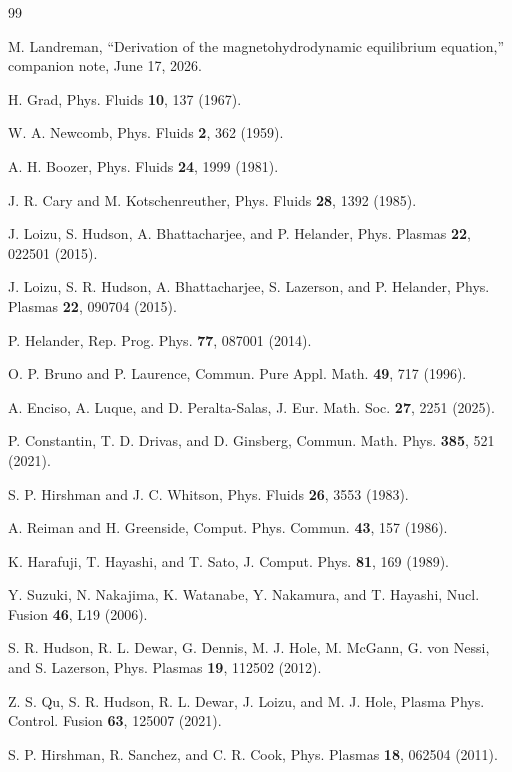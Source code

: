 \documentclass[english]{article}
\begin{document}
\begin{thebibliography}{99}

 M. Landreman, ``Derivation of the magnetohydrodynamic equilibrium
equation,'' companion note, June 17, 2026.

 H. Grad, Phys. Fluids {\bf 10}, 137 (1967).

 W. A. Newcomb, Phys. Fluids {\bf 2}, 362 (1959).

 A. H. Boozer, Phys. Fluids {\bf 24}, 1999 (1981).

 J. R. Cary and M. Kotschenreuther, Phys. Fluids {\bf 28}, 1392 (1985).

 J. Loizu, S. Hudson, A. Bhattacharjee, and P. Helander,
Phys. Plasmas {\bf 22}, 022501 (2015).

 J. Loizu, S. R. Hudson, A. Bhattacharjee, S. Lazerson, and P. Helander,
Phys. Plasmas {\bf 22}, 090704 (2015).

 P. Helander, Rep. Prog. Phys. {\bf 77}, 087001 (2014).

 O. P. Bruno and P. Laurence, Commun. Pure Appl. Math. {\bf 49}, 717 (1996).

 A. Enciso, A. Luque, and D. Peralta-Salas,
J. Eur. Math. Soc. {\bf 27}, 2251 (2025).

 P. Constantin, T. D. Drivas, and D. Ginsberg,
Commun. Math. Phys. {\bf 385}, 521 (2021).

 S. P. Hirshman and J. C. Whitson, Phys. Fluids {\bf 26}, 3553 (1983).

 A. Reiman and H. Greenside, Comput. Phys. Commun. {\bf 43}, 157 (1986).

 K. Harafuji, T. Hayashi, and T. Sato, J. Comput. Phys. {\bf 81}, 169 (1989).

 Y. Suzuki, N. Nakajima, K. Watanabe, Y. Nakamura, and T. Hayashi,
Nucl. Fusion {\bf 46}, L19 (2006).

 S. R. Hudson, R. L. Dewar, G. Dennis, M. J. Hole, M. McGann, G. von Nessi,
and S. Lazerson, Phys. Plasmas {\bf 19}, 112502 (2012).

 Z. S. Qu, S. R. Hudson, R. L. Dewar, J. Loizu, and M. J. Hole,
Plasma Phys. Control. Fusion {\bf 63}, 125007 (2021).

 S. P. Hirshman, R. Sanchez, and C. R. Cook,
Phys. Plasmas {\bf 18}, 062504 (2011).


\end{thebibliography}
\end{document}

